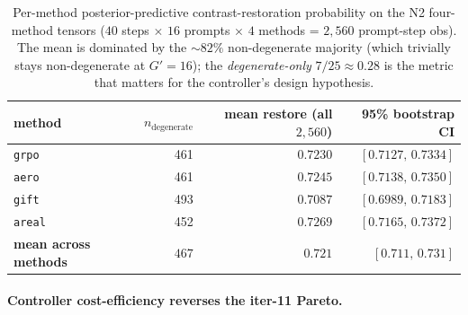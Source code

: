 \documentclass{article}
\begin{document}
\begin{table}[t]
\centering
\caption{Per-method posterior-predictive contrast-restoration
probability on the N2 four-method tensors ($40$ steps $\times$
$16$ prompts $\times$ $4$ methods = $2{,}560$ prompt-step obs).
The mean is dominated by the $\sim 82\%$ non-degenerate majority
(which trivially stays non-degenerate at $G'{=}16$);
the \emph{degenerate-only} $7/25 \approx 0.28$ is the metric that
matters for the controller's design hypothesis.}
\label{tab:p7-postpred-mean}
\begin{tabular}{lrrr}
\toprule
method & $n_{\text{degenerate}}$ & mean restore (all $2{,}560$) & 95\% bootstrap CI \\
\midrule
\texttt{grpo}  & 461 & $0.7230$ & $[0.7127,\, 0.7334]$ \\
\texttt{aero}  & 461 & $0.7245$ & $[0.7138,\, 0.7350]$ \\
\texttt{gift}  & 493 & $0.7087$ & $[0.6989,\, 0.7183]$ \\
\texttt{areal} & 452 & $0.7269$ & $[0.7165,\, 0.7372]$ \\
\midrule
\textbf{mean across methods} & $467$ & $\mathbf{0.721}$ & $[0.711,\, 0.731]$ \\
\bottomrule
\end{tabular}
\end{table}

\paragraph{Controller cost-efficiency reverses the iter-11 Pareto.}
\end{document}
